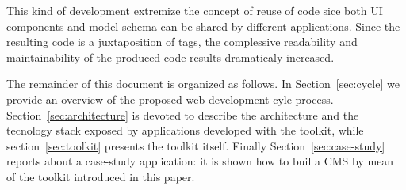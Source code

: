 This kind of development extremize the concept of reuse of code sice both UI components and model schema can be shared by different applications. Since the resulting code is a juxtaposition of tags, the complessive readability and maintainability of the produced code results dramaticaly increased.

The remainder of this document is organized as follows. In
Section~\ref{sec:cycle} we provide an overview of the proposed web development cyle process. Section~\ref{sec:architecture} is devoted to describe the architecture and the tecnology stack exposed by applications developed with the toolkit, while section~\ref{sec:toolkit} presents the toolkit itself. Finally Section~\ref{sec:case-study} reports about a case-study application: it is shown how to buil a CMS by mean of the toolkit introduced in this paper.%

